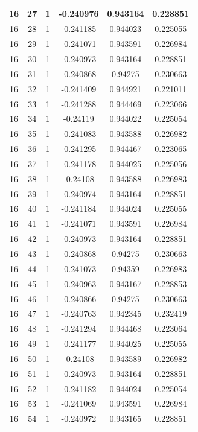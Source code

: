 \documentclass[12pt,a4paper]{article}
\numberwithin{equation}{section}
\numberwithin{figure}{section}
\numberwithin{table}{section}
\begin{document}
\begin{longtable}{|c|c|c|c|c|c|}
16 & 27 & 1 & -0.240976 & 0.943164 & 0.228851 \\ \hline
16 & 28 & 1 & -0.241185 & 0.944023 & 0.225055 \\ \hline
16 & 29 & 1 & -0.241071 & 0.943591 & 0.226984 \\ \hline
16 & 30 & 1 & -0.240973 & 0.943164 & 0.228851 \\ \hline
16 & 31 & 1 & -0.240868 & 0.94275 & 0.230663 \\ \hline
16 & 32 & 1 & -0.241409 & 0.944921 & 0.221011 \\ \hline
16 & 33 & 1 & -0.241288 & 0.944469 & 0.223066 \\ \hline
16 & 34 & 1 & -0.24119 & 0.944022 & 0.225054 \\ \hline
16 & 35 & 1 & -0.241083 & 0.943588 & 0.226982 \\ \hline
16 & 36 & 1 & -0.241295 & 0.944467 & 0.223065 \\ \hline
16 & 37 & 1 & -0.241178 & 0.944025 & 0.225056 \\ \hline
16 & 38 & 1 & -0.24108 & 0.943588 & 0.226983 \\ \hline
16 & 39 & 1 & -0.240974 & 0.943164 & 0.228851 \\ \hline
16 & 40 & 1 & -0.241184 & 0.944024 & 0.225055 \\ \hline
16 & 41 & 1 & -0.241071 & 0.943591 & 0.226984 \\ \hline
16 & 42 & 1 & -0.240973 & 0.943164 & 0.228851 \\ \hline
16 & 43 & 1 & -0.240868 & 0.94275 & 0.230663 \\ \hline
16 & 44 & 1 & -0.241073 & 0.94359 & 0.226983 \\ \hline
16 & 45 & 1 & -0.240963 & 0.943167 & 0.228853 \\ \hline
16 & 46 & 1 & -0.240866 & 0.94275 & 0.230663 \\ \hline
16 & 47 & 1 & -0.240763 & 0.942345 & 0.232419 \\ \hline
16 & 48 & 1 & -0.241294 & 0.944468 & 0.223064 \\ \hline
16 & 49 & 1 & -0.241177 & 0.944025 & 0.225055 \\ \hline
16 & 50 & 1 & -0.24108 & 0.943589 & 0.226982 \\ \hline
16 & 51 & 1 & -0.240973 & 0.943164 & 0.228851 \\ \hline
16 & 52 & 1 & -0.241182 & 0.944024 & 0.225054 \\ \hline
16 & 53 & 1 & -0.241069 & 0.943591 & 0.226984 \\ \hline
16 & 54 & 1 & -0.240972 & 0.943165 & 0.228851 \\ \hline

\end{longtable}
\end{document}
